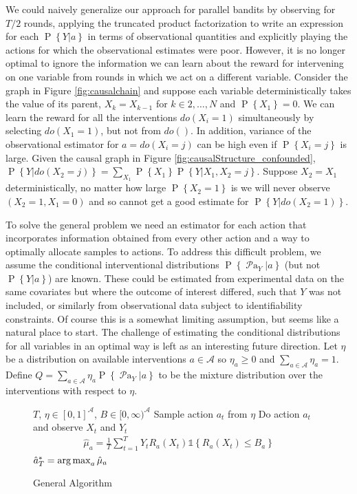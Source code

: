 \documentclass{article}
\newcommand{\set}[1]{\left\{#1\right\}}
\newcommand{\ind}[1]{\mathds{1}\!\!\set{#1}}
\newcommand{\argmax}{\operatornamewithlimits{arg\,max}}
\newcommand{\eq}[1]{\begin{align*}#1\end{align*}}
\renewcommand{\P}[1]{\operatorname{P}\left\{#1\right\}}
\newcommand{\parents}[1]{\operatorname{\mathcal{P}a}_{#1}}
\newcommand{\calA}{\mathcal A}
\theoremstyle{plain}
\theoremstyle{definition}
\begin{document}
We could naively generalize our approach for parallel bandits by observing for $T/2$ rounds, applying the truncated product factorization to 
write an expression for each $\P{Y|a}$ in terms of observational quantities and explicitly playing the actions for which the observational 
estimates were poor. However, it is no longer optimal to ignore the information we can learn about the reward for intervening on one variable 
from rounds in which we act on a different variable. Consider the graph in Figure \ref{fig:causalchain} and suppose each variable deterministically 
takes the value of its parent, $X_k = X_{k-1}$ for $k\in {2,\ldots,N}$ and $\P{X_1} = 0$. We can learn the reward for all the interventions $do(X_i = 1)$ 
simultaneously by selecting $do(X_1 = 1)$, but not from $do()$. In addition, variance of the observational estimator for $a = do(X_i = j)$ can be 
high even if $\P{X_i = j}$ is large. Given the causal graph in Figure \ref{fig:causalStructure_confounded}, $\P{Y|do(X_2= j)} = \sum_{X_1}\P{X_1}\P{Y|X_1, X_2 = j}$. 
Suppose $X_2 = X_1$ deterministically, no matter how large $\P{X_2 = 1}$ is we will never observe $(X_2=1,X_1 = 0)$ and so cannot 
get a good estimate for $\P{Y|do(X_2=1)}$. 

To solve the general problem we need an estimator for each action that incorporates information obtained from every other action and a way to optimally 
allocate samples to actions. To address this difficult problem, we assume the conditional interventional distributions $\P{\parents{Y}|a}$ (but not $\P{Y|a}$) 
are known. These could be estimated from experimental data on the same covariates but where the outcome of interest differed, such that $Y$ was not included, 
or similarly from observational data subject to identifiability constraints. Of course this is a somewhat limiting assumption, but seems like a natural place to
start. The challenge of estimating the conditional distributions for all variables in an optimal way is left as an interesting future direction.
Let $\eta$ be a distribution on available interventions $a \in \calA$ so $\eta_a \geq 0$ and $\sum_{a \in \calA} \eta_a = 1$. 
Define $Q = \sum_{a \in \calA} \eta_a \P{\parents{Y}|a}$ to be the mixture distribution over the interventions with respect to $\eta$.

\begin{figure}
\vspace{-30pt}
\begin{minipage}{.5\textwidth}
\begin{algorithm}[H]
\caption{General Algorithm}\label{alg:general}
\begin{algorithmic}
 $T$, $\eta \in [0,1]^{\calA}$, $B \in [0,\infty)^{\calA}$
\FOR{$t \in \set{1,\ldots,T}$}
\STATE Sample action $a_t$ from $\eta$
\STATE Do action $a_t$ and observe $X_t$ and $Y_t$
\ENDFOR
\FOR{$a \in \calA$}
\STATE
\eq {
\hat \mu_a =  \frac{1}{T} \sum_{t=1}^T Y_t R_a(X_t)  \ind{R_a(X_t) \leq B_a}
}
\ENDFOR
{} $\hat a^*_T = \argmax_a \hat \mu_a$
\end{algorithmic}
\end{algorithm}
\end{minipage}
\end{figure}
\end{document}
